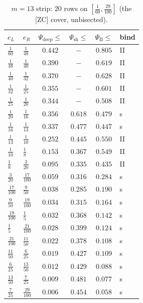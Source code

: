 \documentclass[11pt]{amsart}
\begin{document}
\begin{table}[p]\centering\small
\caption{$m=13$ strip: $20$ rows on $[\tfrac1{60},\tfrac{29}{100}]$ (the [ZC] cover, unbisected).}\label{zc9:tab:m13}
\begin{tabular}{llcccl}\toprule
$e_L$&$e_R$&$\Psi_{\mathrm{deep}}\!\le$&$\Psi_{\mathrm{sh}}\!\le$&$\Psi_{\mathrm{II}}\!\le$&bind\\\midrule
$\tfrac{1}{60}$&$\tfrac{1}{48}$&$0.442$&$-$&$0.805$&II\\
$\tfrac{1}{48}$&$\tfrac{1}{40}$&$0.390$&$-$&$0.619$&II\\
$\tfrac{1}{40}$&$\tfrac{1}{32}$&$0.370$&$-$&$0.628$&II\\
$\tfrac{1}{32}$&$\tfrac{1}{25}$&$0.355$&$-$&$0.601$&II\\
$\tfrac{1}{25}$&$\tfrac{1}{20}$&$0.344$&$-$&$0.508$&II\\
$\tfrac{1}{20}$&$\tfrac{1}{16}$&$0.356$&$0.618$&$0.479$&s\\
$\tfrac{1}{16}$&$\tfrac{1}{13}$&$0.337$&$0.477$&$0.447$&s\\
$\tfrac{1}{13}$&$\tfrac{1}{10}$&$0.252$&$0.445$&$0.550$&II\\
$\tfrac{1}{10}$&$\tfrac{1}{8}$&$0.153$&$0.367$&$0.549$&II\\
$\tfrac{1}{8}$&$\tfrac{3}{20}$&$0.095$&$0.335$&$0.435$&II\\
$\tfrac{3}{20}$&$\tfrac{17}{100}$&$0.059$&$0.316$&$0.284$&s\\
$\tfrac{17}{100}$&$\tfrac{9}{50}$&$0.038$&$0.285$&$0.190$&s\\
$\tfrac{9}{50}$&$\tfrac{19}{100}$&$0.034$&$0.315$&$0.164$&s\\
$\tfrac{19}{100}$&$\tfrac{1}{5}$&$0.032$&$0.368$&$0.142$&s\\
$\tfrac{1}{5}$&$\tfrac{21}{100}$&$0.028$&$0.399$&$0.124$&s\\
$\tfrac{21}{100}$&$\tfrac{11}{50}$&$0.022$&$0.378$&$0.108$&s\\
$\tfrac{11}{50}$&$\tfrac{6}{25}$&$0.019$&$0.427$&$0.109$&s\\
$\tfrac{6}{25}$&$\tfrac{13}{50}$&$0.012$&$0.429$&$0.088$&s\\
$\tfrac{13}{50}$&$\tfrac{7}{25}$&$0.009$&$0.481$&$0.077$&s\\
$\tfrac{7}{25}$&$\tfrac{29}{100}$&$0.006$&$0.454$&$0.058$&s\\
\bottomrule\end{tabular}\end{table}
\end{document}
